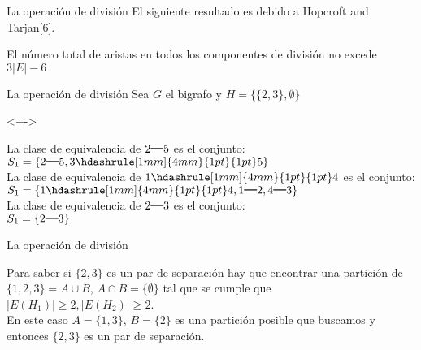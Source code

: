 \documentclass[spanish]{beamer}
\begin{document}
\begin{frame}{La operación de división}
  El siguiente resultado es debido a Hopcroft and Tarjan[6].
  \begin{lemma}
   El número total de aristas en todos los componentes de división no excede $3|E| - 6$
  \end{lemma}
\end{frame}

\begin{frame}{La operación de división}
  Sea $G$ el bigrafo y $H=\{\{2, 3\},  \emptyset\}$
\begin{example}<+->
  \centering
  \end{example}
La clase de equivalencia de $2\rule[1mm]{4mm}{0.3mm}5$ es el conjunto:\\
$S_{1} = \{2\rule[1mm]{4mm}{0.3mm}5, 3 \hdashrule[1mm]{4mm}{1pt}{1pt} 5\}$\\
La clase de equivalencia de $1\hdashrule[1mm]{4mm}{1pt}{1pt} 4$ es el conjunto:\\
$S_{1} = \{1 \hdashrule[1mm]{4mm}{1pt}{1pt} 4, 1\rule[1mm]{4mm}{0.3mm}2, 4\rule[1mm]{4mm}{0.3mm}3\}$\\
La clase de equivalencia de $2\rule[1mm]{4mm}{0.3mm}3$ es el conjunto:\\
$S_{1} = \{2\rule[1mm]{4mm}{0.3mm}3\}$\\
\end{frame}

\begin{frame}{La operación de división}
\begin{block}
Para saber si $\{2,3\}$ es un par de separación hay que encontrar una partición de $\{1, 2, 3\} = A \cup B$, $A \cap B = \{\emptyset\}$ tal que se cumple que $|E(H_{1})| \geq 2, |E(H_{2})| \geq 2$.\\ En este caso $A = \{1, 3\}$, $B=\{2\}$ es una partición posible que buscamos y entonces  $\{2, 3\}$ es un par de separación.\\
\end{block}

\end{frame}
\end{document}
